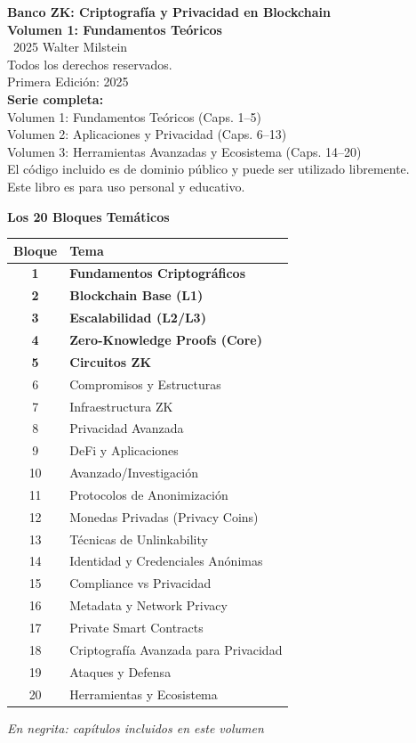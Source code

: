\documentclass[11pt,a4paper,twoside,openright]{book}
\theoremstyle{definition}
\theoremstyle{plain}
\theoremstyle{remark}
\begin{document}
\thispagestyle{empty}
\null\vfill
\begin{center}
\textbf{Banco ZK: Criptograf\'ia y Privacidad en Blockchain}\\
\textbf{Volumen 1: Fundamentos Te\'oricos}\\[1cm]
\textcopyright\ 2025 Walter Milstein\\
Todos los derechos reservados.\\[0.5cm]
Primera Edici\'on: 2025\\[1cm]
\textbf{Serie completa:}\\
Volumen 1: Fundamentos Te\'oricos (Caps. 1--5)\\
Volumen 2: Aplicaciones y Privacidad (Caps. 6--13)\\
Volumen 3: Herramientas Avanzadas y Ecosistema (Caps. 14--20)\\[1cm]
El c\'odigo incluido es de dominio p\'ublico y puede ser utilizado libremente.\\
Este libro es para uso personal y educativo.
\end{center}
\vfill
\cleardoublepage
\thispagestyle{empty}
\null\vfill
\begin{center}
{\Large\bfseries Los 20 Bloques Temáticos}\\[1cm]

\begin{tabular}{cl}
\toprule
\textbf{Bloque} & \textbf{Tema} \\
\midrule
\textbf{1} & \textbf{Fundamentos Criptográficos} \\
\textbf{2} & \textbf{Blockchain Base (L1)} \\
\textbf{3} & \textbf{Escalabilidad (L2/L3)} \\
\textbf{4} & \textbf{Zero-Knowledge Proofs (Core)} \\
\textbf{5} & \textbf{Circuitos ZK} \\
\midrule
6 & Compromisos y Estructuras \\
7 & Infraestructura ZK \\
8 & Privacidad Avanzada \\
9 & DeFi y Aplicaciones \\
10 & Avanzado/Investigación \\
11 & Protocolos de Anonimización \\
12 & Monedas Privadas (Privacy Coins) \\
13 & Técnicas de Unlinkability \\
14 & Identidad y Credenciales Anónimas \\
15 & Compliance vs Privacidad \\
16 & Metadata y Network Privacy \\
17 & Private Smart Contracts \\
18 & Criptografía Avanzada para Privacidad \\
19 & Ataques y Defensa \\
20 & Herramientas y Ecosistema \\
\bottomrule
\end{tabular}

\vspace{1cm}
\textit{En negrita: capítulos incluidos en este volumen}
\end{center}
\end{document}
